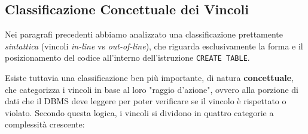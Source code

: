 \subsection{Classificazione Concettuale dei Vincoli}

Nei paragrafi precedenti abbiamo analizzato una classificazione prettamente \textit{sintattica} (vincoli \textit{in-line} vs \textit{out-of-line}), che riguarda esclusivamente la forma e il posizionamento del codice all'interno dell'istruzione \texttt{CREATE TABLE}. 

Esiste tuttavia una classificazione ben più importante, di natura \textbf{concettuale}, che categorizza i vincoli in base al loro "raggio d'azione", ovvero alla porzione di dati che il DBMS deve leggere per poter verificare se il vincolo è rispettato o violato. 
Secondo questa logica, i vincoli si dividono in quattro categorie a complessità crescente:

